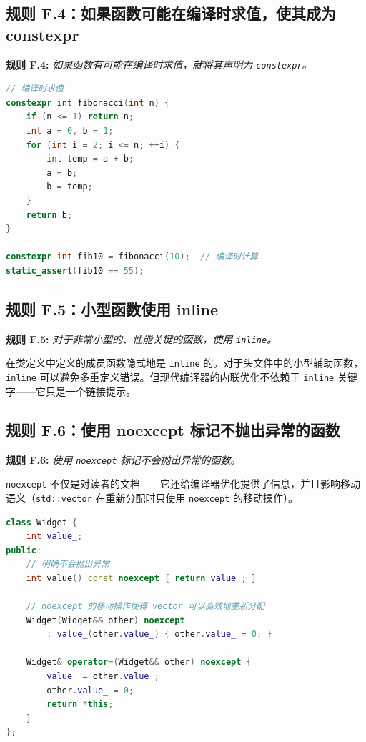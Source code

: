 \subsection{规则 F.4：如果函数可能在编译时求值，使其成为 constexpr}

\textbf{规则 F.4:} \textit{如果函数有可能在编译时求值，就将其声明为 \texttt{constexpr}。}

\begin{lstlisting}[language=C++]
// 编译时求值
constexpr int fibonacci(int n) {
    if (n <= 1) return n;
    int a = 0, b = 1;
    for (int i = 2; i <= n; ++i) {
        int temp = a + b;
        a = b;
        b = temp;
    }
    return b;
}

constexpr int fib10 = fibonacci(10);  // 编译时计算
static_assert(fib10 == 55);
\end{lstlisting}

\subsection{规则 F.5：小型函数使用 inline}

\textbf{规则 F.5:} \textit{对于非常小型的、性能关键的函数，使用 \texttt{inline}。}

在类定义中定义的成员函数隐式地是 \texttt{inline} 的。对于头文件中的小型辅助函数，\texttt{inline} 可以避免多重定义错误。但现代编译器的内联优化不依赖于 \texttt{inline} 关键字——它只是一个链接提示。

\subsection{规则 F.6：使用 noexcept 标记不抛出异常的函数}

\textbf{规则 F.6:} \textit{使用 \texttt{noexcept} 标记不会抛出异常的函数。}

\texttt{noexcept} 不仅是对读者的文档——它还给编译器优化提供了信息，并且影响移动语义（\texttt{std::vector} 在重新分配时只使用 \texttt{noexcept} 的移动操作）。

\begin{lstlisting}[language=C++]
class Widget {
    int value_;
public:
    // 明确不会抛出异常
    int value() const noexcept { return value_; }

    // noexcept 的移动操作使得 vector 可以高效地重新分配
    Widget(Widget&& other) noexcept
        : value_(other.value_) { other.value_ = 0; }

    Widget& operator=(Widget&& other) noexcept {
        value_ = other.value_;
        other.value_ = 0;
        return *this;
    }
};
\end{lstlisting}

